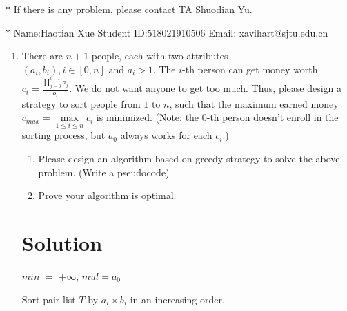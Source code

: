 \documentclass[12pt,a4paper]{article}
\theoremstyle{definition}
\begin{document}
\noindent

\noindent{}
\begin{center}
\footnotesize{\color{red}$*$ If there is any problem, please contact TA Shuodian Yu.}

\footnotesize{\color{blue}$*$ Name:Haotian Xue  \quad Student ID:518021910506 \quad Email: xavihart@sjtu.edu.cn}
\end{center}

\begin{enumerate}
    \item
    There are $n+1$ people, each with two attributes $(a_i,b_i), i\in[0,n] \text{ and } a_i>1$. The $i$-th person can get money worth $c_i = \frac{\prod_{j=0}^{i-1}{a_j}}{b_i}$. We do not want anyone to get too much. Thus, please design a strategy to sort people from $1$ to $n$, such that the maximum earned money $c_{max}=\max\limits_{1\leq i\leq n} c_i$ is minimized. (Note: the 0-th person doesn't enroll in the sorting process, but $a_0$ always works for each $c_i$.)
    \begin{enumerate}
        \item Please design an algorithm based on greedy strategy to solve the above problem. (Write a pseudocode)
        \item Prove your algorithm is optimal.
    \end{enumerate}

    \section*{\normalsize{Solution}}
        \begin{minipage}[t]{0.80\textwidth}
       \begin{algorithm}[H]
           $min$ $=$ +$\infty$, $mul=a_0$
           
           Sort pair list $T$ by $a_i \times b_i$ in an increasing order.

        \end{algorithm}
        \end{minipage} 
    

\end{enumerate}
\end{document}
